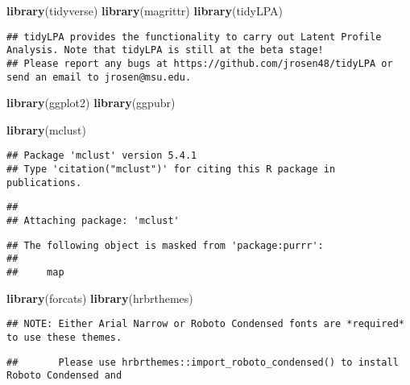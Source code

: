 \documentclass[]{article}
\newenvironment{Shaded}{\begin{snugshade}}{\end{snugshade}}
\newcommand{\KeywordTok}[1]{\textcolor[rgb]{0.13,0.29,0.53}{\textbf{{#1}}}}
\newcommand{\NormalTok}[1]{{#1}}
\begin{document}
\begin{Shaded}
\begin{Highlighting}[]
\KeywordTok{library}\NormalTok{(tidyverse)}
\KeywordTok{library}\NormalTok{(magrittr)}
\KeywordTok{library}\NormalTok{(tidyLPA)}
\end{Highlighting}
\end{Shaded}

\begin{verbatim}
## tidyLPA provides the functionality to carry out Latent Profile Analysis. Note that tidyLPA is still at the beta stage! 
## Please report any bugs at https://github.com/jrosen48/tidyLPA or send an email to jrosen@msu.edu.
\end{verbatim}

\begin{Shaded}
\begin{Highlighting}[]
\KeywordTok{library}\NormalTok{(ggplot2)}
\KeywordTok{library}\NormalTok{(ggpubr)}

\KeywordTok{library}\NormalTok{(mclust)}
\end{Highlighting}
\end{Shaded}

\begin{verbatim}
## Package 'mclust' version 5.4.1
## Type 'citation("mclust")' for citing this R package in publications.
\end{verbatim}

\begin{verbatim}
## 
## Attaching package: 'mclust'
\end{verbatim}

\begin{verbatim}
## The following object is masked from 'package:purrr':
## 
##     map
\end{verbatim}

\begin{Shaded}
\begin{Highlighting}[]
\KeywordTok{library}\NormalTok{(forcats)}
\KeywordTok{library}\NormalTok{(hrbrthemes)}
\end{Highlighting}
\end{Shaded}

\begin{verbatim}
## NOTE: Either Arial Narrow or Roboto Condensed fonts are *required* to use these themes.
\end{verbatim}

\begin{verbatim}
##       Please use hrbrthemes::import_roboto_condensed() to install Roboto Condensed and
\end{verbatim}
\end{document}
